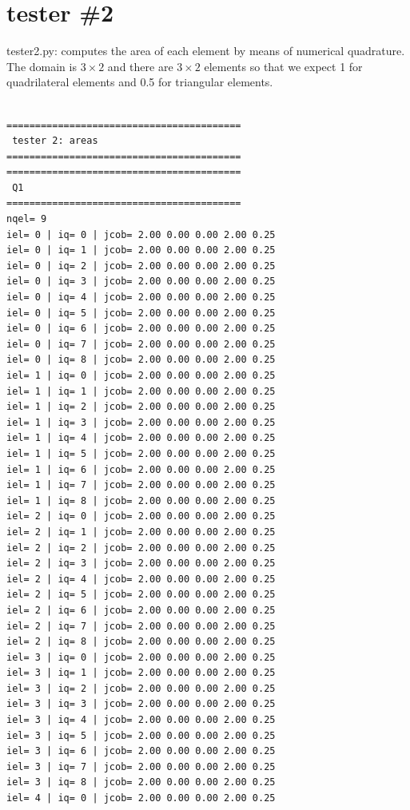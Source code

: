 \section*{tester \#2}

{\pythonfile tester2.py}: computes the area of each element by means of numerical 
quadrature. The domain is $3 \times 2$ and there are $3 \times 2$ elements so that we expect 1 for 
quadrilateral elements and 0.5 for triangular elements.  

\begin{tiny}
\begin{verbatim}

=========================================
 tester 2: areas
=========================================
=========================================
 Q1
=========================================
nqel= 9
iel= 0 | iq= 0 | jcob= 2.00 0.00 0.00 2.00 0.25
iel= 0 | iq= 1 | jcob= 2.00 0.00 0.00 2.00 0.25
iel= 0 | iq= 2 | jcob= 2.00 0.00 0.00 2.00 0.25
iel= 0 | iq= 3 | jcob= 2.00 0.00 0.00 2.00 0.25
iel= 0 | iq= 4 | jcob= 2.00 0.00 0.00 2.00 0.25
iel= 0 | iq= 5 | jcob= 2.00 0.00 0.00 2.00 0.25
iel= 0 | iq= 6 | jcob= 2.00 0.00 0.00 2.00 0.25
iel= 0 | iq= 7 | jcob= 2.00 0.00 0.00 2.00 0.25
iel= 0 | iq= 8 | jcob= 2.00 0.00 0.00 2.00 0.25
iel= 1 | iq= 0 | jcob= 2.00 0.00 0.00 2.00 0.25
iel= 1 | iq= 1 | jcob= 2.00 0.00 0.00 2.00 0.25
iel= 1 | iq= 2 | jcob= 2.00 0.00 0.00 2.00 0.25
iel= 1 | iq= 3 | jcob= 2.00 0.00 0.00 2.00 0.25
iel= 1 | iq= 4 | jcob= 2.00 0.00 0.00 2.00 0.25
iel= 1 | iq= 5 | jcob= 2.00 0.00 0.00 2.00 0.25
iel= 1 | iq= 6 | jcob= 2.00 0.00 0.00 2.00 0.25
iel= 1 | iq= 7 | jcob= 2.00 0.00 0.00 2.00 0.25
iel= 1 | iq= 8 | jcob= 2.00 0.00 0.00 2.00 0.25
iel= 2 | iq= 0 | jcob= 2.00 0.00 0.00 2.00 0.25
iel= 2 | iq= 1 | jcob= 2.00 0.00 0.00 2.00 0.25
iel= 2 | iq= 2 | jcob= 2.00 0.00 0.00 2.00 0.25
iel= 2 | iq= 3 | jcob= 2.00 0.00 0.00 2.00 0.25
iel= 2 | iq= 4 | jcob= 2.00 0.00 0.00 2.00 0.25
iel= 2 | iq= 5 | jcob= 2.00 0.00 0.00 2.00 0.25
iel= 2 | iq= 6 | jcob= 2.00 0.00 0.00 2.00 0.25
iel= 2 | iq= 7 | jcob= 2.00 0.00 0.00 2.00 0.25
iel= 2 | iq= 8 | jcob= 2.00 0.00 0.00 2.00 0.25
iel= 3 | iq= 0 | jcob= 2.00 0.00 0.00 2.00 0.25
iel= 3 | iq= 1 | jcob= 2.00 0.00 0.00 2.00 0.25
iel= 3 | iq= 2 | jcob= 2.00 0.00 0.00 2.00 0.25
iel= 3 | iq= 3 | jcob= 2.00 0.00 0.00 2.00 0.25
iel= 3 | iq= 4 | jcob= 2.00 0.00 0.00 2.00 0.25
iel= 3 | iq= 5 | jcob= 2.00 0.00 0.00 2.00 0.25
iel= 3 | iq= 6 | jcob= 2.00 0.00 0.00 2.00 0.25
iel= 3 | iq= 7 | jcob= 2.00 0.00 0.00 2.00 0.25
iel= 3 | iq= 8 | jcob= 2.00 0.00 0.00 2.00 0.25
iel= 4 | iq= 0 | jcob= 2.00 0.00 0.00 2.00 0.25

\end{verbatim}
\end{tiny}
